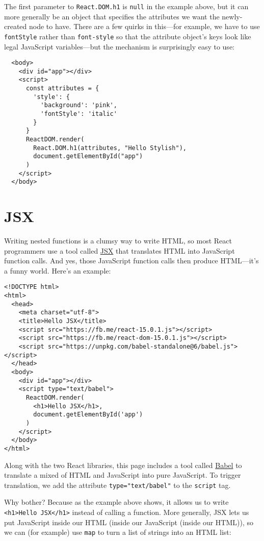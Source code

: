The first parameter to \texttt{React.DOM.h1} is \texttt{null} in the example above,
but it can more generally be an object that specifies
the attributes we want the newly-created node to have.
There are a few quirks in this---for example,
we have to use \texttt{fontStyle} rather than \texttt{font-style}
so that the attribute object's keys look like legal JavaScript variables---but
the mechanism is surprisingly easy to use:

\begin{verbatim}
  <body>
    <div id="app"></div>
    <script>
      const attributes = {
        'style': {
          'background': 'pink',
          'fontStyle': 'italic'
        }
      }
      ReactDOM.render(
        React.DOM.h1(attributes, "Hello Stylish"),
        document.getElementById("app")
      )
    </script>
  </body>
\end{verbatim}

\section{JSX}\label{s:dynamic-jsx}

Writing nested functions is a clumsy way to write HTML,
so most React programmers use a tool called \href{https://reactjs.org/docs/introducing-jsx.html}{JSX}
that translates HTML into JavaScript function calls.
And yes,
those JavaScript function calls then produce HTML---it's a funny world.
Here's an example:

\begin{verbatim}
<!DOCTYPE html>
<html>
  <head>
    <meta charset="utf-8">
    <title>Hello JSX</title>
    <script src="https://fb.me/react-15.0.1.js"></script>
    <script src="https://fb.me/react-dom-15.0.1.js"></script>
    <script src="https://unpkg.com/babel-standalone@6/babel.js"></script>
  </head>
  <body>
    <div id="app"></div>
    <script type="text/babel">
      ReactDOM.render(
        <h1>Hello JSX</h1>,
        document.getElementById('app')
      )
    </script>
  </body>
</html>
\end{verbatim}

Along with the two React libraries,
this page includes a tool called \href{https://babeljs.io/}{Babel}
to translate a mixed of HTML and JavaScript into pure JavaScript.
To trigger translation,
we add the attribute \texttt{type="text/babel"} to the \texttt{script} tag.

Why bother?
Because as the example above shows,
it allows us to write \texttt{{\textless}h1{\textgreater}{}Hello\ JSX{\textless}/h1{\textgreater}{}} instead of calling a function.
More generally,
JSX lets us put JavaScript inside our HTML (inside our JavaScript (inside our HTML)),
so we can (for example) use \texttt{map} to turn a list of strings into an HTML list:

